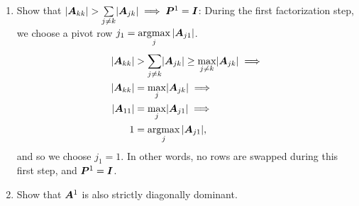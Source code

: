 \documentclass[twoside,10pt]{article}
\DeclareMathOperator*{\argmax}{argmax}
\begin{document}
\begin{enumerate}
  \item Show that $\left|\mtx{A}_{kk}\right| > \sum \limits_{j \neq k} \left|\mtx{A}_{jk}\right| \implies \mtx{P}^1 = \mtx{I}$:
  During the first factorization step, we choose a pivot row $j_1 = \argmax\limits_{j}{\left|\mtx{A}_{j 1}\right|}$.
  \begin{align*}
    \left|\mtx{A}_{kk}\right| &> \sum \limits_{j \neq k} \left|\mtx{A}_{jk}\right| \geq \max\limits_{j \neq k} \left|\mtx{A}_{jk}\right| \implies\\
    \left|\mtx{A}_{kk}\right| &= \max\limits_{j} \left|\mtx{A}_{jk}\right| \implies\\
    \left|\mtx{A}_{1 1}\right| &= \max\limits_{j} \left|\mtx{A}_{j 1}\right| \implies\\
    1 &= \argmax\limits_{j}{\left|\mtx{A}_{j 1}\right|},
  \end{align*}
  and so we choose $j_1 = 1$.
  In other words, no rows are swapped during this first step, and $\bm{P}^1 = \bm{I}$.
  \item Show that $\bm{A}^{1}$ is also strictly diagonally dominant.


\end{enumerate}
\end{document}
